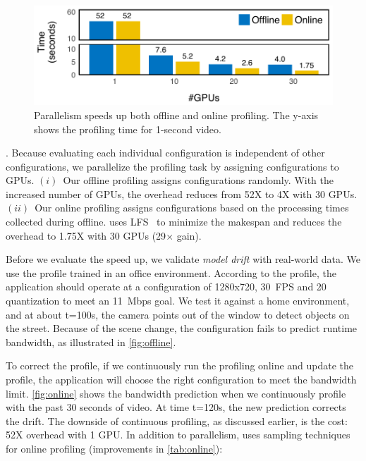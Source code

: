 \begin{figure}
  \centering
  \includegraphics[width=1.0\columnwidth]{figures/parallel.pdf}
  \caption{Parallelism speeds up both offline and online profiling.
  The y-axis shows the profiling time for 1-second video.}
  \label{fig:parallel}
  \vspace{-1em}
\end{figure}

. Because
evaluating each individual configuration is independent of other configurations,
we parallelize the profiling task by assigning configurations to GPUs.
$(i)$~Our offline profiling assigns configurations randomly.  With the increased
number of GPUs, the overhead reduces from 52X to 4X with 30 GPUs.  $(ii)$~Our
online profiling assigns configurations based on the processing times collected
during offline.  \sysname{} uses LFS~\cite{karger2010scheduling} to minimize the
makespan and reduces the overhead to 1.75X with 30 GPUs (29$\times$ gain).

Before we evaluate the speed up, we validate \textit{model drift} with
real-world data. We use the profile trained in an office environment.  According
to the profile, the application should operate at a configuration of 1280x720,
\SI{30}{FPS} and 20 quantization to meet an \SI{11}{Mbps} goal.  We test it
against a home environment, and at about t=100s, the camera points out of the
window to detect objects on the street. Because of the scene change, the
configuration fails to predict runtime bandwidth, as illustrated in
\autoref{fig:offline}.

To correct the profile, if we continuously run the profiling online and update
the profile, the application will choose the right configuration to meet the
bandwidth limit.  \autoref{fig:online} shows the bandwidth prediction when we
continuously profile with the past 30 seconds of video. At time t=120s, the new
prediction corrects the drift. The downside of continuous profiling, as
discussed earlier, is the cost: 52X overhead with 1 GPU\@. In addition to
parallelism, \sysname{} uses sampling techniques for online profiling
(improvements in \autoref{tab:online}):

